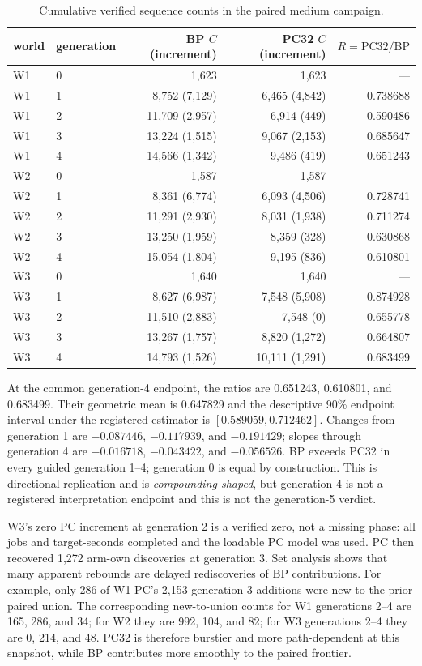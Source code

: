 \documentclass[11pt]{article}
\newcommand{\pc}{\mathrm{PC32}}
\newcommand{\bp}{\mathrm{BP}}
\begin{document}
\begin{table}[ht]
\centering
\caption{Cumulative verified sequence counts in the paired medium campaign.}
\label{tab:trajectory}
\begin{tabular}{@{}llrrr@{}}
\toprule
world & generation & BP $C$ (increment) & PC32 $C$ (increment) & $R=\pc/\bp$ \\
\midrule
W1 & 0 & 1,623 & 1,623 & --- \\
W1 & 1 & 8,752 (7,129) & 6,465 (4,842) & 0.738688 \\
W1 & 2 & 11,709 (2,957) & 6,914 (449) & 0.590486 \\
W1 & 3 & 13,224 (1,515) & 9,067 (2,153) & 0.685647 \\
W1 & 4 & 14,566 (1,342) & 9,486 (419) & 0.651243 \\
\addlinespace
W2 & 0 & 1,587 & 1,587 & --- \\
W2 & 1 & 8,361 (6,774) & 6,093 (4,506) & 0.728741 \\
W2 & 2 & 11,291 (2,930) & 8,031 (1,938) & 0.711274 \\
W2 & 3 & 13,250 (1,959) & 8,359 (328) & 0.630868 \\
W2 & 4 & 15,054 (1,804) & 9,195 (836) & 0.610801 \\
\addlinespace
W3 & 0 & 1,640 & 1,640 & --- \\
W3 & 1 & 8,627 (6,987) & 7,548 (5,908) & 0.874928 \\
W3 & 2 & 11,510 (2,883) & 7,548 (0) & 0.655778 \\
W3 & 3 & 13,267 (1,757) & 8,820 (1,272) & 0.664807 \\
W3 & 4 & 14,793 (1,526) & 10,111 (1,291) & 0.683499 \\
\bottomrule
\end{tabular}
\end{table}

At the common generation-4 endpoint, the ratios are 0.651243, 0.610801, and 0.683499.
Their geometric mean is 0.647829 and the descriptive 90\% endpoint interval under the
registered estimator is $[0.589059,0.712462]$.  Changes from generation 1 are
$-0.087446$, $-0.117939$, and $-0.191429$; slopes through generation 4 are
$-0.016718$, $-0.043422$, and $-0.056526$.  BP exceeds PC32 in every guided generation
1--4; generation 0 is equal by construction.  This is directional replication and is
\emph{compounding-shaped}, but generation 4 is not a registered interpretation endpoint
and this is not the generation-5 verdict.

W3's zero PC increment at generation 2 is a verified zero, not a missing phase: all jobs
and target-seconds completed and the loadable PC model was used.  PC then recovered 1,272
arm-own discoveries at generation 3.  Set analysis shows that many apparent rebounds are
delayed rediscoveries of BP contributions.  For example, only 286 of W1 PC's 2,153
generation-3 additions were new to the prior paired union.  The corresponding new-to-union
counts for W1 generations 2--4 are 165, 286, and 34; for W2 they are 992, 104, and 82; for
W3 generations 2--4 they are 0, 214, and 48.  PC32 is therefore burstier and more path-dependent
at this snapshot, while BP contributes more smoothly to the paired frontier.
\end{document}
